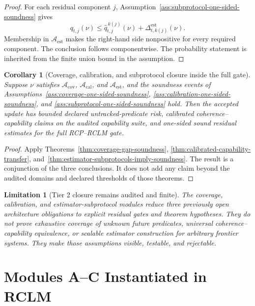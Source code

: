 \documentclass[11pt,a4paper]{article}
\newtheorem{corollary}[theorem]{Corollary}
\newtheorem{limitation}[theorem]{Limitation}
\newcommand{\Acal}{\mathcal A}
\newcommand{\calib}{\mathrm{cal}}
\newcommand{\cov}{\mathrm{cov}}
\newcommand{\est}{\mathrm{est}}
\begin{document}
\begin{proof}
For each residual component \(j\), Assumption~\ref{ass:subprotocol-one-sided-soundness} gives
\[
q_{t,j}(\nu)
\le
\widehat q_{t,j}^{\,k(j)}(\nu)+\Delta_{t,k(j)}^{\est}(\nu).
\]
Membership in \(\Acal_{\est}\) makes the right-hand side nonpositive for every required component. The conclusion follows componentwise. The probability statement is inherited from the finite union bound in the assumption.
\end{proof}

\begin{corollary}[Coverage, calibration, and subprotocol closure inside the full gate]
\label{cor:tier2-closure-full-gate}
Suppose \(\nu\) satisfies \(\Acal_{\cov}\), \(\Acal_{\calib}\), and \(\Acal_{\est}\), and the soundness events of Assumptions~\ref{ass:coverage-one-sided-soundness}, \ref{ass:calibration-one-sided-soundness}, and \ref{ass:subprotocol-one-sided-soundness} hold. Then the accepted update has bounded declared untracked-predicate risk, calibrated coherence--capability claims on the audited capability suite, and one-sided sound residual estimates for the full RCP--RCLM gate.
\end{corollary}

\begin{proof}
Apply Theorems~\ref{thm:coverage-gap-soundness}, \ref{thm:calibrated-capability-transfer}, and~\ref{thm:estimator-subprotocols-imply-soundness}. The result is a conjunction of the three conclusions. It does not add any claim beyond the audited domains and declared thresholds of those theorems.
\end{proof}

\begin{limitation}[Tier 2 closure remains audited and finite]
\label{lim:tier2-closure-finite}
The coverage, calibration, and estimator-subprotocol modules reduce three previously open architecture obligations to explicit residual gates and theorem hypotheses. They do not prove exhaustive coverage of unknown future predicates, universal coherence--capability equivalence, or scalable estimator construction for arbitrary frontier systems. They make those assumptions visible, testable, and rejectable.
\end{limitation}


\section{Modules A--C Instantiated in RCLM}
\end{document}
